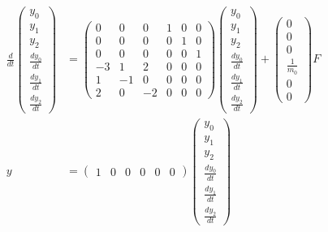 \documentclass[a4paper,11pt]{jreport}
\begin{document}
\begin{align}
 \frac{d}{dt} \left(\begin{array}{c}
	         y_0 \\
		     y_1 \\
		     y_2 \\
		     \frac{dy_0}{dt} \\
		     \frac{dy_1}{dt} \\
		     \frac{dy_2}{dt}
		    \end{array}\right)
 &=
 \left(\begin{array}{rrrrrr}
        0 & 0 & 0 & 1 & 0 & 0      \\
        0 & 0 & 0 & 0 & 1 & 0      \\
        0 & 0 & 0 & 0 & 0 & 1      \\
	-3& 1 & 2 & 0 & 0 & 0 \\
	1 & -1& 0 & 0 & 0 & 0 \\
	2 & 0 & -2& 0 & 0 & 0 
       \end{array}\right)
 \left(\begin{array}{c}
	         y_0 \\
		     y_1 \\
		     y_2 \\
		     \frac{dy_0}{dt} \\
		     \frac{dy_1}{dt} \\
		     \frac{dy_2}{dt}
       \end{array}\right)
 +
 \left(\begin{array}{c}
        0 \\
        0 \\
        0 \\
	    \frac{1}{m_0} \\
	    0 \\
	    0 
       \end{array}\right)
        F
\nonumber
\\
y &=
 \left(\begin{array}{cccccc}
         1 & 0 & 0 & 0 & 0 & 0
       \end{array}\right)
 \left(\begin{array}{c}
	         y_0 \\
		     y_1 \\
		     y_2 \\
		     \frac{dy_0}{dt} \\
		     \frac{dy_1}{dt} \\
		     \frac{dy_2}{dt}
       \end{array}\right)
\nonumber
\end{align}
\end{document}
